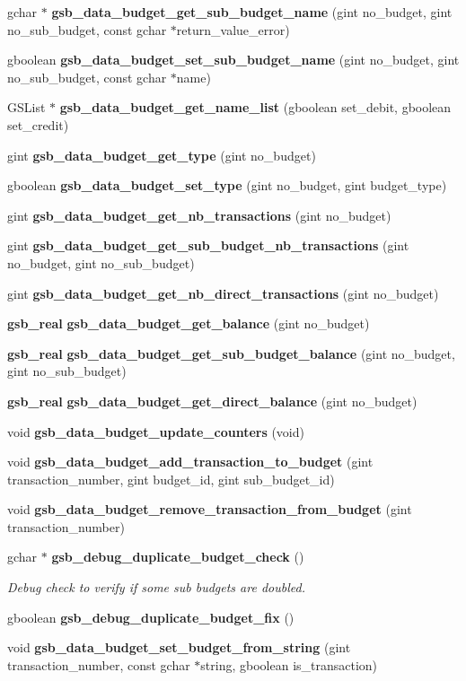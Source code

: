 \begin{DoxyCompactItemize}
gchar $\ast$ {\bf gsb\_\-data\_\-budget\_\-get\_\-sub\_\-budget\_\-name} (gint no\_\-budget, gint no\_\-sub\_\-budget, const gchar $\ast$return\_\-value\_\-error)
\item 
gboolean {\bf gsb\_\-data\_\-budget\_\-set\_\-sub\_\-budget\_\-name} (gint no\_\-budget, gint no\_\-sub\_\-budget, const gchar $\ast$name)
\item 
GSList $\ast$ {\bf gsb\_\-data\_\-budget\_\-get\_\-name\_\-list} (gboolean set\_\-debit, gboolean set\_\-credit)
\item 
gint {\bf gsb\_\-data\_\-budget\_\-get\_\-type} (gint no\_\-budget)
\item 
gboolean {\bf gsb\_\-data\_\-budget\_\-set\_\-type} (gint no\_\-budget, gint budget\_\-type)
\item 
gint {\bf gsb\_\-data\_\-budget\_\-get\_\-nb\_\-transactions} (gint no\_\-budget)
\item 
gint {\bf gsb\_\-data\_\-budget\_\-get\_\-sub\_\-budget\_\-nb\_\-transactions} (gint no\_\-budget, gint no\_\-sub\_\-budget)
\item 
gint {\bf gsb\_\-data\_\-budget\_\-get\_\-nb\_\-direct\_\-transactions} (gint no\_\-budget)
\item 
{\bf gsb\_\-real} {\bf gsb\_\-data\_\-budget\_\-get\_\-balance} (gint no\_\-budget)
\item 
{\bf gsb\_\-real} {\bf gsb\_\-data\_\-budget\_\-get\_\-sub\_\-budget\_\-balance} (gint no\_\-budget, gint no\_\-sub\_\-budget)
\item 
{\bf gsb\_\-real} {\bf gsb\_\-data\_\-budget\_\-get\_\-direct\_\-balance} (gint no\_\-budget)
\item 
void {\bf gsb\_\-data\_\-budget\_\-update\_\-counters} (void)
\item 
void {\bf gsb\_\-data\_\-budget\_\-add\_\-transaction\_\-to\_\-budget} (gint transaction\_\-number, gint budget\_\-id, gint sub\_\-budget\_\-id)
\item 
void {\bf gsb\_\-data\_\-budget\_\-remove\_\-transaction\_\-from\_\-budget} (gint transaction\_\-number)
\item 
gchar $\ast$ {\bf gsb\_\-debug\_\-duplicate\_\-budget\_\-check} ()
\begin{DoxyCompactList}\small\item\em Debug check to verify if some sub budgets are doubled. \item\end{DoxyCompactList}\item 
gboolean {\bf gsb\_\-debug\_\-duplicate\_\-budget\_\-fix} ()
\item 
void {\bf gsb\_\-data\_\-budget\_\-set\_\-budget\_\-from\_\-string} (gint transaction\_\-number, const gchar $\ast$string, gboolean is\_\-transaction)
\end{DoxyCompactItemize}
